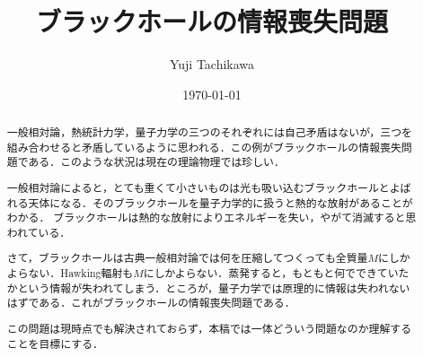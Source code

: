 \documentclass[english, dvipdfmx, a4paper]{jsarticle}
\title{ブラックホールの情報喪失問題}
\author{Yuji Tachikawa}
\date{\today}
\theoremstyle{break}
\begin{document}
	\maketitle
	\begin{abstract}
			一般相対論，熱統計力学，量子力学の三つのそれぞれには自己矛盾はないが，三つを組み合わせると矛盾しているように思われる．この例がブラックホールの情報喪失問題である．このような状況は現在の理論物理では珍しい．

			一般相対論によると，とても重くて小さいものは光も吸い込むブラックホールとよばれる天体になる\cite{Schwarzschild:1916uq}．そのブラックホールを量子力学的に扱うと熱的な放射があることがわかる\cite{Hawking:1974rv}．
			ブラックホールは熱的な放射によりエネルギーを失い，やがて消滅すると思われている．

			さて，ブラックホールは古典一般相対論では何を圧縮してつくっても全質量$M $にしかよらない．Hawking輻射も$M $にしかよらない．蒸発すると，もともと何でできていたかという情報が失われてしまう．ところが，量子力学では原理的に情報は失われないはずである．これがブラックホールの情報喪失問題である．

			この問題は現時点でも解決されておらず，本稿では一体どういう問題なのか理解することを目標にする．
	\end{abstract}
	\tableofcontents
	
	
	
	
	
\end{document}

